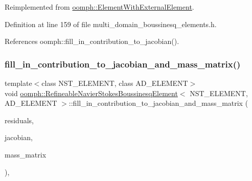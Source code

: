 Reimplemented from \hyperlink{classoomph_1_1ElementWithExternalElement_ae5fb09552a8271e891438f8d058ca1b8}{oomph\+::\+Element\+With\+External\+Element}.



Definition at line 159 of file multi\+\_\+domain\+\_\+boussinesq\+\_\+elements.\+h.



References oomph\+::fill\+\_\+in\+\_\+contribution\+\_\+to\+\_\+jacobian().

\mbox{\label{classoomph_1_1RefineableNavierStokesBoussinesqElement_a02e9c7f347aa1c6defbcb20049fc8985}} 
\subsubsection{\texorpdfstring{fill\+\_\+in\+\_\+contribution\+\_\+to\+\_\+jacobian\+\_\+and\+\_\+mass\+\_\+matrix()}{fill\_in\_contribution\_to\_jacobian\_and\_mass\_matrix()}}
{\footnotesize\ttfamily template$<$class N\+S\+T\+\_\+\+E\+L\+E\+M\+E\+NT, class A\+D\+\_\+\+E\+L\+E\+M\+E\+NT$>$ \\
void \hyperlink{classoomph_1_1RefineableNavierStokesBoussinesqElement}{oomph\+::\+Refineable\+Navier\+Stokes\+Boussinesq\+Element}$<$ N\+S\+T\+\_\+\+E\+L\+E\+M\+E\+NT, A\+D\+\_\+\+E\+L\+E\+M\+E\+NT $>$\+::fill\+\_\+in\+\_\+contribution\+\_\+to\+\_\+jacobian\+\_\+and\+\_\+mass\+\_\+matrix (\begin{DoxyParamCaption}\item[{\hyperlink{classoomph_1_1Vector}{Vector}$<$ double $>$ \&}]{residuals,  }\item[{\hyperlink{classoomph_1_1DenseMatrix}{Dense\+Matrix}$<$ double $>$ \&}]{jacobian,  }\item[{\hyperlink{classoomph_1_1DenseMatrix}{Dense\+Matrix}$<$ double $>$ \&}]{mass\+\_\+matrix }\end{DoxyParamCaption})\hspace{0.3cm}{\ttfamily [inline]}, {\ttfamily [virtual]}}

